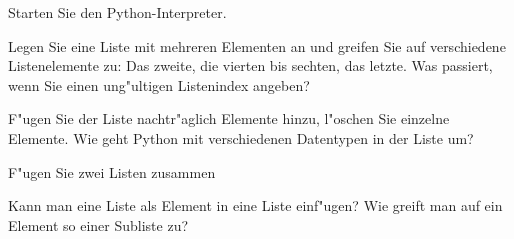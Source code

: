 \begin{aufgabe}[Listen]
Starten Sie den Python-Interpreter.
\begin{auflistung}
\item Legen Sie eine Liste mit mehreren Elementen an und greifen Sie auf verschiedene Listenelemente zu: Das zweite, die vierten bis sechten, das letzte. Was passiert, wenn Sie einen ung"ultigen Listenindex angeben?
\item F"ugen Sie der Liste nachtr"aglich Elemente hinzu, l"oschen Sie einzelne Elemente. Wie geht Python mit verschiedenen Datentypen in der Liste um?
\item F"ugen Sie zwei Listen zusammen
\item Kann man eine Liste als Element in eine Liste einf"ugen? Wie greift man auf ein Element so einer Subliste zu?
\end{auflistung}
\end{aufgabe}

